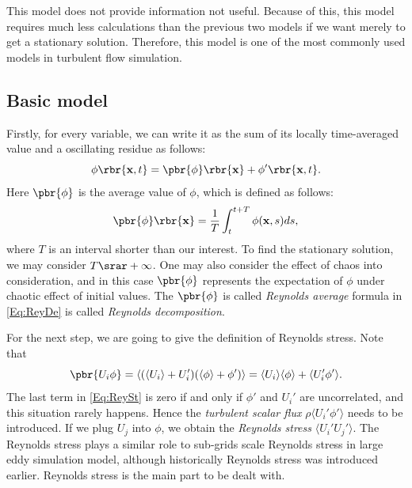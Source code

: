\documentclass[english, nochinese]{pkupaper}
\begin{document}
This model does not provide information not useful. Because of this, this model requires much less calculations than the previous two models if we want merely to get a stationary solution. Therefore, this model is one of the most commonly used models in turbulent flow simulation.

\subsection{Basic model}

Firstly, for every variable, we can write it as the sum of its locally time-averaged value and a oscillating residue as follows:
\begin{equation}\label{Eq:ReyDe}
\phi\rbr{ \mathbf{x} , t} = \pbr{\phi}\rbr{\mathbf{x}} + \phi'\rbr{\mathbf{x}, t}.
\end{equation}
Here $\pbr{\phi}$ is the average value of $\phi$, which is defined as follows:
\begin{equation}
\pbr{\phi} \rbr{\mathbf{x}} = \frac{1}{T} \int_t^{t+T}\phi(\mathbf{x}, s)ds,
\end{equation}
where $T$ is an interval shorter than our interest. To find the stationary solution, we may consider $ T \srar +\infty $. One may also consider the effect of chaos into consideration, and in this case $\pbr{\phi}$ represents the expectation of $\phi$ under chaotic effect of initial values. The $\pbr{\phi}$ is called \emph{Reynolds average} formula in \eqref{Eq:ReyDe} is called \emph{Reynolds decomposition}.

For the next step, we are going to give the definition of Reynolds stress. Note that
\begin{equation}\label{Eq:ReySt}
\pbr{ U_i \phi } = \langle(\langle U_i\rangle+U_i')(\langle\phi\rangle+\phi')\rangle = \langle U_i\rangle\langle\phi\rangle + \langle U_i'\phi'\rangle.
\end{equation}
The last term in \eqref{Eq:ReySt} is zero if and only if $\phi'$ and $U_i'$ are uncorrelated, and this situation rarely happens. Hence the \emph{turbulent scalar flux} $\rho\langle U_i'\phi'\rangle$ needs to be introduced. If we plug $U_j$ into $\phi$, we obtain the \emph{Reynolds stress} $\langle U_i'U_j'\rangle$. The Reynolds stress plays a similar role to sub-grids scale Reynolds stress in large eddy simulation model, although historically Reynolds stress was introduced earlier. Reynolds stress is the main part to be dealt with.
\end{document}
